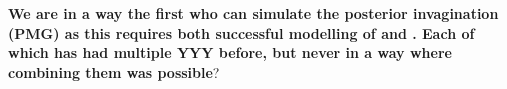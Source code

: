 \begin{figure}[H]
    \centering
\end{figure}

\textbf{We are in a way the first who can simulate the posterior invagination (PMG)  as this requires both successful modelling of  and . Each of which has had multiple YYY before, but never in a way where combining them was possible}?

